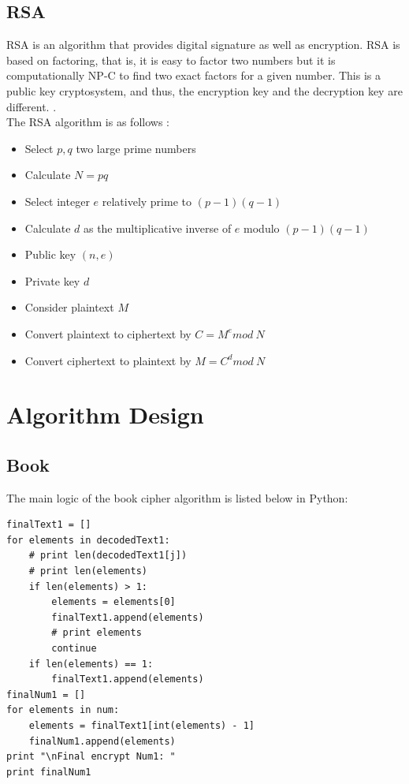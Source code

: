 \documentclass[12pt]{article}
\begin{document}
\subsection{RSA}
RSA is an algorithm that provides digital signature as well as encryption. RSA is based on factoring, that is, it is easy to factor two numbers but it is computationally NP-C to find two exact factors for a given number. This is a public key cryptosystem, and thus, the encryption key and the decryption key are different. \cite{rsaIntro}. \\
The RSA algorithm is as follows \cite{rsaSteps}:

\begin{itemize}
\item Select $p, q$ two large prime numbers
\item Calculate $N = pq$
\item Select integer $e$ relatively prime to $(p-1)(q-1)$
\item Calculate $d$ as the multiplicative inverse of $e$ modulo $(p-1)(q-1)$
\item Public key $(n, e)$
\item Private key $d$
\item Consider plaintext $M$
\item Convert plaintext to ciphertext by $C=M^{e}mod\ N$
\item Convert ciphertext to plaintext by $M=C^{d}mod\ N$
\end{itemize}

\section{Algorithm Design}
\subsection{Book}
The main logic of the book cipher algorithm is listed below in Python:
\begin{lstlisting}
finalText1 = []
for elements in decodedText1:
    # print len(decodedText1[j])
    # print len(elements)
    if len(elements) > 1:
        elements = elements[0]
        finalText1.append(elements)
        # print elements
        continue
    if len(elements) == 1:
        finalText1.append(elements)
finalNum1 = []
for elements in num:
    elements = finalText1[int(elements) - 1]
    finalNum1.append(elements)
print "\nFinal encrypt Num1: "
print finalNum1
\end{lstlisting}
\end{document}
